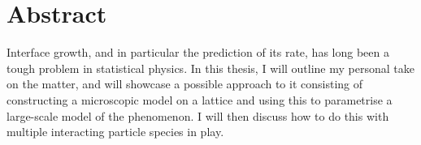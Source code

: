\chapter{Abstract}

Interface growth, and in particular the prediction of its rate, has long been a tough problem in statistical physics. In this thesis, I will outline my personal take on the matter, and will showcase a possible approach to it consisting of
constructing a microscopic model on a lattice and using this to parametrise a large-scale model of the phenomenon. I will then discuss how to do this with multiple interacting particle species in play.